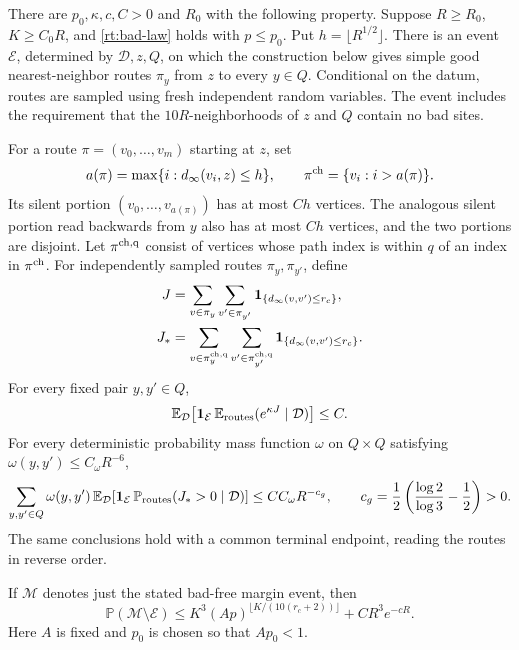 \begin{proposition}
\label{rt:routes}
There are \(p_0,\kappa,c,C>0\) and \(R_0\) with the following
property.  Suppose \(R\ge R_0\), \(K\ge C_0R\), and
\eqref{rt:bad-law} holds with \(p\le p_0\).  Put
\(h=\lfloor R^{1/2}\rfloor\).  There is an event \(\mathcal E\),
determined by \(\mathcal D,z,Q\), on which the construction below gives
simple good nearest-neighbor routes \(\pi_y\) from \(z\) to every
\(y\in Q\).  Conditional on the datum, routes are sampled using fresh
independent random variables.  The event includes the requirement that
the \(10R\)-neighborhoods of \(z\) and \(Q\) contain no bad sites.

For a route \(\pi=(v_0,\ldots,v_m)\) starting at \(z\), set
\[
 a(\pi)=\max\{i:d_\infty(v_i,z)\le h\},\qquad
 \pi^{\rm ch}=\{v_i:i>a(\pi)\}.
\]
Its silent portion \((v_0,\ldots,v_{a(\pi)})\) has at most \(Ch\)
vertices.  The analogous silent portion read backwards from \(y\)
also has at most \(Ch\) vertices, and the two portions are disjoint.
Let \(\pi^{\rm ch,q}\) consist of vertices whose path index is within
\(q\) of an index in \(\pi^{\rm ch}\).  For independently sampled
routes \(\pi_y,\pi_{y'}\), define
\begin{align*}
 J&=\sum_{v\in\pi_y}\sum_{v'\in\pi_{y'}}
       \mathbf1_{\{d_\infty(v,v')\le r_c\}},\\
 J_*&=\sum_{v\in\pi_y^{\rm ch,q}}
       \sum_{v'\in\pi_{y'}^{\rm ch,q}}
       \mathbf1_{\{d_\infty(v,v')\le r_c\}}.
\end{align*}
For every fixed pair \(y,y'\in Q\),
\begin{equation}\label{rt:exponential}
 \mathbb E_{\mathcal D}\!\left[
  \mathbf1_{\mathcal E}\,
  \mathbb E_{\rm routes}(e^{\kappa J}\mid\mathcal D)\right]\le C.
\end{equation}
For every deterministic probability mass function \(\omega\) on
\(Q\times Q\) satisfying \(\omega(y,y')\le C_\omega R^{-6}\),
\begin{equation}\label{rt:rare}
 \sum_{y,y'\in Q}\omega(y,y')\,
 \mathbb E_{\mathcal D}\!\left[
  \mathbf1_{\mathcal E}\,
  \mathbb P_{\rm routes}(J_*>0\mid\mathcal D)\right]
 \le CC_\omega R^{-c_g},\qquad
 c_g=\frac12\left(\frac{\log2}{\log3}-\frac12\right)>0.
\end{equation}
The same conclusions hold with a common terminal endpoint, reading the
routes in reverse order.

If \(\mathcal M\) denotes just the stated bad-free margin event, then
\begin{equation}\label{rt:rejection}
 \mathbb P(\mathcal M\setminus\mathcal E)
 \le K^3(Ap)^{\lfloor K/(10(r_c+2))\rfloor}
       +CR^3e^{-cR}.
\end{equation}
Here \(A\) is fixed and \(p_0\) is chosen so that \(Ap_0<1\).
\end{proposition}

